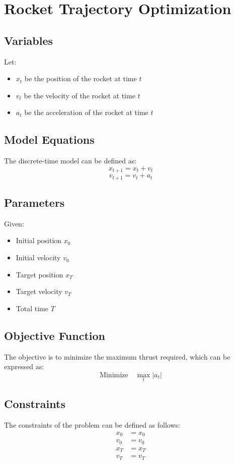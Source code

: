 \documentclass{article}
\begin{document}
\section*{Rocket Trajectory Optimization}

\subsection*{Variables}
Let:
\begin{itemize}
    \item \( x_t \) be the position of the rocket at time \( t \)
    \item \( v_t \) be the velocity of the rocket at time \( t \)
    \item \( a_t \) be the acceleration of the rocket at time \( t \)
\end{itemize}

\subsection*{Model Equations}
The discrete-time model can be defined as:
\[
x_{t+1} = x_t + v_t
\]
\[
v_{t+1} = v_t + a_t
\]

\subsection*{Parameters}
Given:
\begin{itemize}
    \item Initial position \( x_0 \)
    \item Initial velocity \( v_0 \)
    \item Target position \( x_T \)
    \item Target velocity \( v_T \)
    \item Total time \( T \)
\end{itemize}

\subsection*{Objective Function}
The objective is to minimize the maximum thrust required, which can be expressed as:
\[
\text{Minimize} \quad \max_{t} |a_t|
\]

\subsection*{Constraints}
The constraints of the problem can be defined as follows:
\begin{align*}
x_0 &= x_0 \\
v_0 &= v_0 \\
x_T &= x_T \\
v_T &= v_T
\end{align*}
\end{document}
